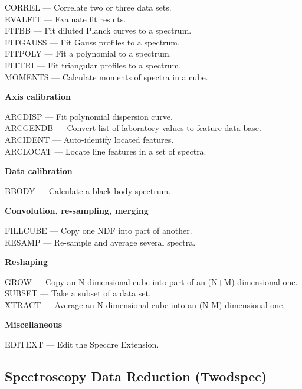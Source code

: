\documentclass[11pt,twoside]{article}
\newcommand{\htmlref}[2]{#1}
\newcommand{\xlabel}[1]{}
\begin{document}
\htmlref{CORREL}{CORREL} --- Correlate two or three data sets.\\
\htmlref{EVALFIT}{EVALFIT} --- Evaluate fit results.\\
\htmlref{FITBB}{FITBB} --- Fit diluted Planck curves to a spectrum.\\
\htmlref{FITGAUSS}{FITGAUSS} --- Fit Gauss profiles to a spectrum.\\
\htmlref{FITPOLY}{FITPOLY} --- Fit a polynomial to a spectrum.\\
\htmlref{FITTRI}{FITTRI} --- Fit triangular profiles to a spectrum.\\
\htmlref{MOMENTS}{MOMENTS} --- Calculate moments of spectra in a cube.

{\bf Axis calibration}

\htmlref{ARCDISP}{ARCDISP} --- Fit polynomial dispersion curve.\\
\htmlref{ARCGENDB}{ARCGENDB} --- Convert list of laboratory values to feature data base.\\
\htmlref{ARCIDENT}{ARCIDENT} --- Auto-identify located features.\\
\htmlref{ARCLOCAT}{ARCLOCAT} --- Locate line features in a set of spectra.

{\bf Data calibration}

\htmlref{BBODY}{BBODY} --- Calculate a black body spectrum.

{\bf Convolution, re-sampling, merging}

\htmlref{FILLCUBE}{FILLCUBE} --- Copy one NDF into part of another.\\
\htmlref{RESAMP}{RESAMP} --- Re-sample and average several spectra.

{\bf Reshaping}

\htmlref{GROW}{GROW} --- Copy an N-dimensional cube into part of an (N+M)-dimensional one.\\
\htmlref{SUBSET}{SUBSET} --- Take a subset of a data set.\\
\htmlref{XTRACT}{XTRACT} --- Average an N-dimensional cube into an (N-M)-dimensional one.

{\bf Miscellaneous}

\htmlref{EDITEXT}{EDITEXT} --- Edit the Specdre Extension.\\


\subsection{\label{classiftwodspec}\xlabel{classiftwodspec}Spectroscopy Data Reduction (Twodspec)}
\end{document}
